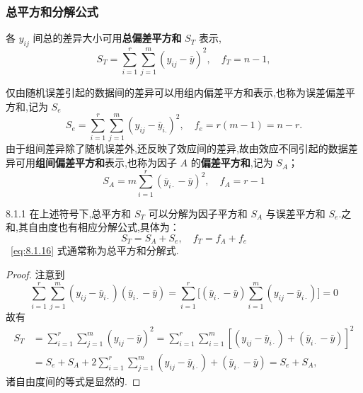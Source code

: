 \subsubsection{总平方和分解公式}

各 $y_{ij}$ 间总的差异大小可用\textbf{总偏差平方和} $S_T$ 表示,
\begin{equation}\label{eq:8.1.13}
  S_{T}=\sum_{i=1}^{r} \sum_{j=1}^{m}\left(y_{i j}-\bar{y}\right)^{2}, \quad f_{T} = n-1,
\end{equation}

仅由随机误差引起的数据间的差异可以用组内偏差平方和表示,也称为误差偏差平方和,记为 $S_e$
\begin{equation}\label{eq:8.1.14}
  S_{e}=\sum_{i=1}^{r} \sum_{j=1}^{m}\left(y_{i j}-\bar{y}_{i .}\right)^{2}, \quad f_{e}=r(m-1)=n-r.
\end{equation}
由于组间差异除了随机误差外,还反映了效应间的差异,故由效应不同引起的数据差异可用\textbf{组间偏差平方和}表示,也称为因子 $A$ 的\textbf{偏差平方和},记为 $S_A$；
\begin{equation}\label{eq:8.1.15}
  S_{A}=m \sum_{i=1}^{r}\left(\bar{y}_{i\cdot}-\bar{y}\right)^{2}, \quad f_{A}=r-1
\end{equation}

\begin{theorem}{}{8.1.1}
在上述符号下,总平方和 $S_T$ 可以分解为因子平方和 $S_A$ 与误差平方和 $S_e$.之和,其自由度也有相应分解公式,具体为：
\begin{equation} \label{eq:8.1.16}
S_{T}=S_{A}+ S_{e}, \quad f_{T}=f_{A}+f_{e}
\end{equation}
~\eqref{eq:8.1.16} 式通常称为总平方和分解式.
\end{theorem}

\begin{proof}
注意到
  \begin{equation*}
    \sum_{i=1}^{r} \sum_{j=1}^{m}(y_{i j}-\bar{y}_{i\cdot})(\bar{y}_{i\cdot}-\bar{y})= \sum_{i=1}^{r}\big[(\bar{y}_{i\cdot}-\bar{y}) \sum_{i=1}^{m}(y_{i j}-\bar{y}_{i\cdot})\big]=0
    \end{equation*}
故有
    \begin{align*}
      S_{T} & =\sum_{i=1}^{r} \sum_{j=1}^{m}(y_{i j}-\bar{y})^{2} = \sum_{i=1}^{r} \sum_{i=1}^{m}[(y_{i j}-\bar{y}_{i\cdot})+(\bar{y}_{i\cdot}-\bar{y})]^{2}\\
      &=S_{e}+S_{A} + 2 \sum_{i=1}^{r} \sum_{j=1}^{m}(y_{i j}-\bar{y}_{i\cdot})+(\bar{y}_{i\cdot}-\bar{y}) = S_{e} + S_{A},
    \end{align*}
诸自由度间的等式是显然的.
\end{proof}

